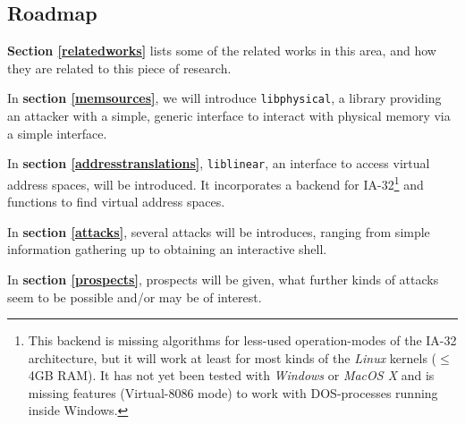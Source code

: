 \subsection{Roadmap}

\textbf{Section \ref{relatedworks}} lists some of the related works in this
area, and how they are related to this piece of research.

In \textbf{section \ref{memsources}}, we will introduce \texttt{libphysical}, a
library providing an attacker with a simple, generic interface to interact with
physical memory via a simple interface.

In \textbf{section \ref{addresstranslations}}, \texttt{liblinear}, an interface
to access virtual address spaces, will be introduced. It incorporates a backend
for IA-32\footnote{This backend is missing algorithms for less-used
operation-modes of the IA-32 architecture, but it will work at least for most
kinds of the \emph{Linux} kernels ($\leq$ 4GB RAM). It has not yet been tested
with \emph{Windows} or \emph{MacOS X} and is missing features (Virtual-8086
mode) to work with DOS-processes running inside Windows.} and functions to find
virtual address spaces.



In \textbf{section \ref{attacks}}, several attacks will be introduces, ranging
from simple information gathering up to obtaining an interactive shell.


In \textbf{section \ref{prospects}}, prospects will be given, what further kinds
of attacks seem to be possible and/or may be of interest.

